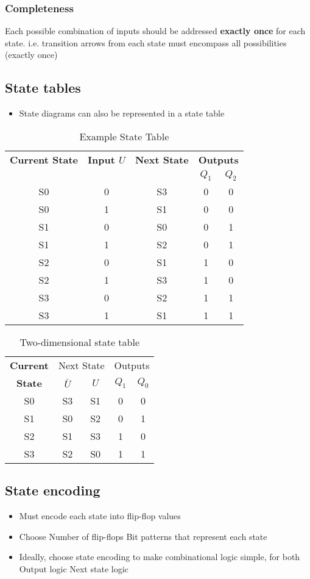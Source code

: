 \subsubsection{Completeness}
Each possible combination of inputs should be addressed \textbf{exactly once} for each state. i.e. transition arrows from each state must encompass all possibilities (exactly once)

\subsection{State tables}
\begin{itemize}
	\item State diagrams can also be represented in a state table	
\end{itemize}

\begin{table}[H]
	\centering
	\caption{Example State Table}
	\begin{tabular}{cc|c|cc}
		\textbf{Current State} & \textbf{Input $U$} & \textbf{Next State} & \multicolumn{2}{c}{\textbf{Outputs}}\\
		&&& $Q_1$ & $Q_2$\\\hline
		S0 & 0 & S3 & 0 & 0\\
		S0 & 1 & S1 & 0 & 0\\
		S1 & 0 & S0 & 0 & 1\\
		S1 & 1 & S2 & 0 & 1\\
		S2 & 0 & S1 & 1 & 0\\
		S2 & 1 & S3 & 1 & 0\\
		S3 & 0 & S2 & 1 & 1\\
		S3 & 1 & S1 & 1 & 1
	\end{tabular}
\end{table}

\begin{table}[H]
	\centering
	\caption{Two-dimensional state table}
	\begin{tabular}{c|cc|cc}
		\textbf{Current} & \multicolumn{2}{c}{Next State} & \multicolumn{2}{c}{Outputs}\\
		\textbf{State} & $\bar{U}$ & $U$ & $Q_1$ & $Q_0$\\\hline
		S0 & S3 & S1 & 0 & 0\\
		S1 & S0 & S2 & 0 & 1\\
		S2 & S1 & S3 & 1 & 0\\
		S3 & S2 & S0 & 1 & 1
	\end{tabular}
\end{table}

\subsection{State encoding}
\begin{itemize}
	\item Must encode each state into flip-flop values
	\item Choose
	\subitem Number of flip-flops
	\subitem Bit patterns that represent each state
	\item Ideally, choose state encoding to make combinational logic simple, for both
	\subitem Output logic
	\subitem Next state logic	
\end{itemize}